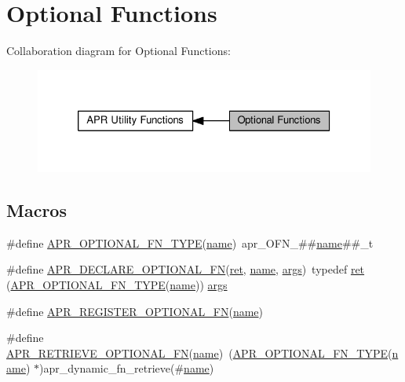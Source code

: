 \hypertarget{group__APR__Util__Opt}{}\section{Optional Functions}
\label{group__APR__Util__Opt}
Collaboration diagram for Optional Functions\+:
\nopagebreak
\begin{figure}[H]
\begin{center}
\leavevmode
\includegraphics[width=326pt]{group__APR__Util__Opt}
\end{center}
\end{figure}
\subsection*{Macros}
\begin{DoxyCompactItemize}
\item 
\#define \hyperlink{group__APR__Util__Opt_ga987fcf75505450f1b4ff9d7b3a7ff5d3}{A\+P\+R\+\_\+\+O\+P\+T\+I\+O\+N\+A\+L\+\_\+\+F\+N\+\_\+\+T\+Y\+PE}(\hyperlink{pcre_8txt_a5a15d68aadb41c771fe50a27c400d49b}{name})~apr\+\_\+\+O\+F\+N\+\_\+\#\#\hyperlink{pcre_8txt_a5a15d68aadb41c771fe50a27c400d49b}{name}\#\#\+\_\+t
\item 
\#define \hyperlink{group__APR__Util__Opt_gaf3ff372e28978d4ce0be7517ca2fddbd}{A\+P\+R\+\_\+\+D\+E\+C\+L\+A\+R\+E\+\_\+\+O\+P\+T\+I\+O\+N\+A\+L\+\_\+\+FN}(\hyperlink{group__APACHE__MPM_ga794c48ec324a4d85a40f38fe264d2a41}{ret},  \hyperlink{pcre_8txt_a5a15d68aadb41c771fe50a27c400d49b}{name},  \hyperlink{group__APR__Util__DBD_ga6b6dfca544bdc17e0e73e3ca56c2363d}{args})~typedef \hyperlink{group__APACHE__MPM_ga794c48ec324a4d85a40f38fe264d2a41}{ret} (\hyperlink{request_8c_ad6e41f8ba25f44ef3fe2792af1127dbc}{A\+P\+R\+\_\+\+O\+P\+T\+I\+O\+N\+A\+L\+\_\+\+F\+N\+\_\+\+T\+Y\+PE}(\hyperlink{pcre_8txt_a5a15d68aadb41c771fe50a27c400d49b}{name})) \hyperlink{group__APR__Util__DBD_ga6b6dfca544bdc17e0e73e3ca56c2363d}{args}
\item 
\#define \hyperlink{group__APR__Util__Opt_gab611deabd6e78b5f666071e8cbdcc736}{A\+P\+R\+\_\+\+R\+E\+G\+I\+S\+T\+E\+R\+\_\+\+O\+P\+T\+I\+O\+N\+A\+L\+\_\+\+FN}(\hyperlink{pcre_8txt_a5a15d68aadb41c771fe50a27c400d49b}{name})
\item 
\#define \hyperlink{group__APR__Util__Opt_ga35f2df25ca06248d2fdd3e7463446418}{A\+P\+R\+\_\+\+R\+E\+T\+R\+I\+E\+V\+E\+\_\+\+O\+P\+T\+I\+O\+N\+A\+L\+\_\+\+FN}(\hyperlink{pcre_8txt_a5a15d68aadb41c771fe50a27c400d49b}{name})~(\hyperlink{request_8c_ad6e41f8ba25f44ef3fe2792af1127dbc}{A\+P\+R\+\_\+\+O\+P\+T\+I\+O\+N\+A\+L\+\_\+\+F\+N\+\_\+\+T\+Y\+PE}(\hyperlink{pcre_8txt_a5a15d68aadb41c771fe50a27c400d49b}{name}) $\ast$)apr\+\_\+dynamic\+\_\+fn\+\_\+retrieve(\#\hyperlink{pcre_8txt_a5a15d68aadb41c771fe50a27c400d49b}{name})
\end{DoxyCompactItemize}
